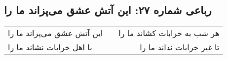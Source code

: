 \begin{center}
\section*{رباعی شماره ۲۷: این آتش عشق می‌پزاند ما را}
\label{sec:0027}
\begin{longtable}{l p{0.5cm} r}
این آتش عشق می‌پزاند ما را
&&
هر شب به خرابات کشاند ما را
\\
با اهل خرابات نشاند ما را
&&
تا غیر خرابات نداند ما را
\\
\end{longtable}
\end{center}

